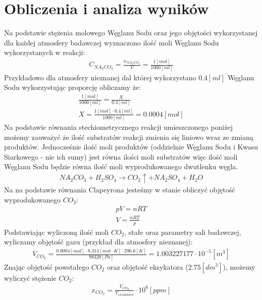 \documentclass[11pt]{article}
\begin{document}
    \section{Obliczenia i analiza wyników}
    \par Na podstawie stężenia molowego Węglanu Sodu oraz jego objętości wykorzystanej dla każdej atmosfery badawczej wyznaczono ilość moli Węglanu Sodu
    wykorzystanych w reakcji:
    \begin{gather}
        C_{NA_{2}CO_{3}}=\frac{n_{NA_{2}CO_{3}}}{V}=\frac{1[mol]}{1000[ml]}
    \end{gather}
    \noindent Przykładowo dla atmosfery nieznanej dal której wykorzystano $0.4[ml]$ Węglanu Sodu wykorzystując proporcję obliczamy że:
    \begin{gather}
        \frac{1[mol]}{1000[ml]}=\frac{X}{0.4[ml]} \\
        X=\frac{1[mol]\cdot 0.4[ml]}{1000[ml]}=0.0004[mol]
    \end{gather}
    \noindent Na podstawie równania stechiometrycznego reakcji umieszczonego poniżej możemy zauważyć że ilość substratów reakcji zmienia się liniowo
    wraz ze zmianą produktów. Jednocześnie ilość moli produktów (oddzielnie Węglanu Sodu i Kwasu Siarkowego - nie ich sumy) jest równa ilości moli
    substratów więc ilość moli Węglanu Sodu będzie równa ilość moli wyprodukowanego dwutlenku węgla.
    \begin{gather}
        NA_{2}CO_{3}+H_{2}SO_{4}\rightarrow CO_{2}\uparrow+NA_{2}SO_{4}+H_{2}O
    \end{gather}
    \noindent Na na podstawie równania Clapeyrona jesteśmy w stanie obliczyć objętość wyprodukowanego $CO_2$:
    \begin{gather}
        pV=nRT \\
        V=\frac{nRT}{p}
    \end{gather}
    \noindent Podstawiając wyliczoną ilość moli $CO_2$, stałe oraz parametry sali badawczej, wyliczamy objętość gazu (przykład dla atmosfery nieznanej):
    \begin{gather}
        V_{CO_2}=\frac{0.0004[mol]\cdot 8.314[mol\cdot K]\cdot 296.6[K]}{98320[Pa]}=1.003227177\cdot 10^{-5}[m^3]
    \end{gather}
    \noindent Znając objętość powstałego $CO_2$ oraz objętość eksykatora ($2.75[dm^3]$), możemy wyliczyć stężenie $CO_2$:
    \begin{gather}
        x_{CO_2}=\frac{V_{CO_2}}{V_{ekskatora}}\cdot 10^6[ppm]
    \end{gather}
\end{document}
